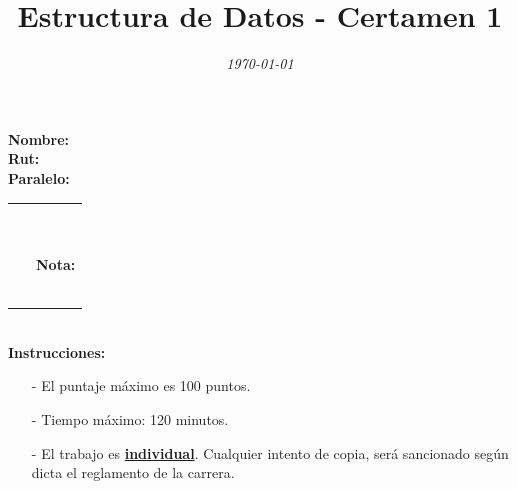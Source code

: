\documentclass{exam}
\title{\LARGE\color{azul}\textbf{Estructura de Datos - Certamen 1 }}
\author{\smallsize \color{gray}{Profesor: } \color{black}{\textbf{Eduardo Godoy}}}
\date{\normalsize \em \today}
\begin{document}

\maketitle

\begin{multicols}{2}
  \begin{flushleft}
    \textbf{Nombre:} \\
    \vspace*{2mm}
    \textbf{Rut:} \\
    \vspace*{2mm}
    \textbf{Paralelo:}
  \end{flushleft}
  \begin{center}
    \begin{table}[H]
      \begin{tabular}{p{4cm}|p{3cm}|}
        \arrayrulecolor{gray!50}\cline{2-2} ~ & {\em {\scriptsize \color{gray!50}{Puntaje:}}}\\
         & ~ \\
         ~ & \textbf{Nota:}
        \\ & ~ \\
        \arrayrulecolor{gray!50}\cline{2-2}
      \end{tabular}
    \end{table}
  \end{center}
\end{multicols}

\noindent
\textbf{\\Instrucciones:}
\begin{itemize}
\item[-] El puntaje máximo  es 100 puntos.
\item[-] Tiempo máximo: 120 minutos.
\item[-] El trabajo es \underline{\textbf{individual}}. Cualquier intento de copia, será sancionado según dicta el reglamento de la carrera.
\end{itemize}
\end{document}
